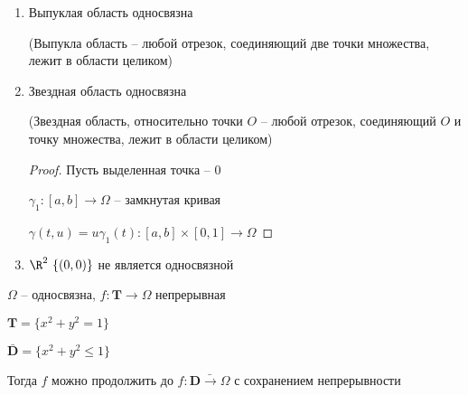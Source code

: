 \begin{example}\thmslashn
	
	\begin{enumerate}
		\item 
		Выпуклая область односвязна 
		
		(Выпукла область -- любой отрезок, соединяющий две точки множества, лежит в области целиком)
		
		\item
		Звездная область односвязна
		
		(Звездная область, относительно точки $O$ -- любой отрезок, соединяющий $O$ и точку множества, лежит в области целиком)
		
		\begin{proof}\thmslashn
			
			Пусть выделенная точка -- $0$
			
			$\gamma_1:[a, b] \to \Omega$ -- замкнутая кривая
			
			$\gamma(t, u) = u\gamma_1(t):[a, b]\times[0,1]\to \Omega$
			
		\end{proof}
		
		\item
		$\R^2 \ \{(0, 0)\} $ не является односвязной
		
	\end{enumerate}
	
\end{example}

\begin{exerc}\thmslashn
	
	$\Omega$ -- односвязна, $f:\mathbf{T} \to \Omega$ непрерывная
	
	$\mathbf{T} = \{x^2 + y^2 = 1\}$
	
	$\bar{\mathbf{D}} = \{x^2 + y^2 \leqslant 1\}$
	
	Тогда $f$ можно продолжить до $f:\bar{\mathbf{D}\to \Omega}$ с сохранением непрерывности
	
\end{exerc}